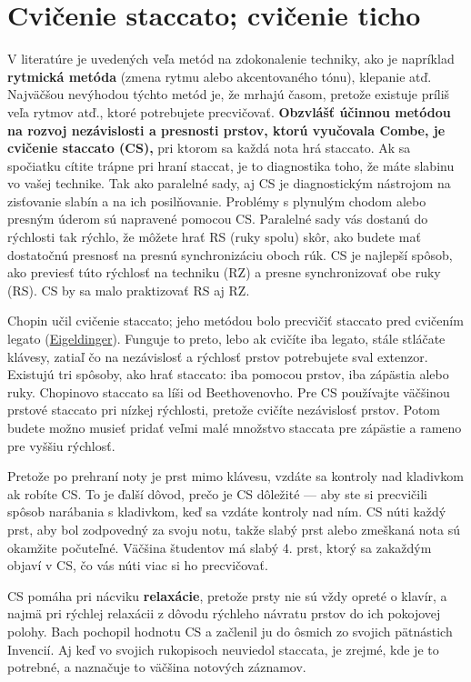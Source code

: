 \documentclass[11pt,a4paper]{book}
\begin{document}
\section{Cvičenie staccato; cvičenie ticho}\label{s:staccato}
V literatúre je uvedených veľa metód na zdokonalenie techniky, ako je napríklad \textbf{rytmická metóda} (zmena rytmu alebo akcentovaného tónu), klepanie atď. Najväčšou nevýhodou týchto metód je, že mrhajú časom, pretože existuje príliš veľa rytmov atď., ktoré potrebujete precvičovať. \textbf{Obzvlášť účinnou metódou na rozvoj nezávislosti a presnosti prstov, ktorú vyučovala Combe, je cvičenie staccato (CS),} pri ktorom sa každá nota hrá staccato. Ak sa spočiatku cítite trápne pri hraní staccat, je to diagnostika toho, že máte slabinu vo vašej technike. Tak ako paralelné sady, aj CS je diagnostickým nástrojom na zisťovanie slabín a na ich posilňovanie. Problémy s plynulým chodom alebo presným úderom sú napravené pomocou CS. Paralelné sady vás dostanú do rýchlosti tak rýchlo, že môžete hrať RS (ruky spolu) skôr, ako budete mať dostatočnú presnosť na presnú synchronizáciu oboch rúk. CS je najlepší spôsob, ako previesť túto rýchlosť na techniku (RZ) a presne synchronizovať obe ruky (RS). CS by sa malo praktizovať RS aj RZ.

Chopin učil cvičenie staccato; jeho metódou bolo precvičiť staccato pred cvičením legato (\hyperlink{r:eigeldinger}{Eigeldinger}). Funguje to preto, lebo ak cvičíte iba legato, stále stláčate klávesy, zatiaľ čo na nezávislosť a rýchlosť prstov potrebujete sval extenzor. Existujú tri spôsoby, ako hrať staccato: iba pomocou prstov, iba zápästia alebo ruky. Chopinovo staccato sa líši od Beethovenovho. Pre CS používajte väčšinou prstové staccato pri nízkej rýchlosti, pretože cvičíte nezávislosť prstov. Potom budete možno musieť pridať veľmi malé množstvo staccata pre zápästie a rameno pre vyššiu rýchlosť.

Pretože po prehraní noty je prst mimo klávesu, vzdáte sa kontroly nad kladivkom ak robíte CS. To je ďalší dôvod, prečo je CS dôležité — aby ste si precvičili spôsob narábania s kladivkom, keď sa vzdáte kontroly nad ním. CS núti každý prst, aby bol zodpovedný za svoju notu, takže slabý prst alebo zmeškaná nota sú okamžite počuteľné. Väčšina študentov má slabý 4. prst, ktorý sa zakaždým objaví v CS, čo vás núti viac si ho precvičovať.

CS pomáha pri nácviku \textbf{relaxácie}, pretože prsty nie sú vždy opreté o klavír, a najmä pri rýchlej relaxácii z dôvodu rýchleho návratu prstov do ich pokojovej polohy. Bach pochopil hodnotu CS a začlenil ju do ôsmich zo svojich pätnástich Invencií. Aj keď vo svojich rukopisoch neuviedol staccata, je zrejmé, kde je to potrebné, a naznačuje to väčšina notových záznamov.
\end{document}
